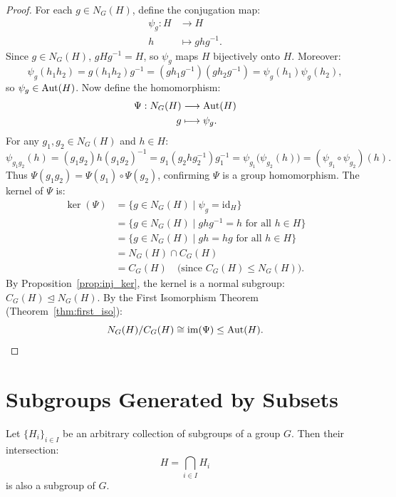 \begin{proof}
For each $g \in N_G(H)$, define the conjugation map:
\begin{align*}
\psi_g: H &\longrightarrow H \\
h &\longmapsto ghg^{-1}.
\end{align*}
Since $g \in N_G(H)$, $gHg^{-1} = H$, so $\psi_g$ maps $H$ bijectively onto $H$. Moreover:
\begin{equation*}
\psi_g(h_1 h_2) = g(h_1 h_2)g^{-1} = (gh_1 g^{-1})(gh_2 g^{-1}) = \psi_g(h_1)\psi_g(h_2),
\end{equation*}
so $\psi_g \in \operatorname{Aut}(H)$.
Now define the homomorphism:
\begin{align*}
\Psi: N_G(H) &\longrightarrow \operatorname{Aut}(H) \\
g &\longmapsto \psi_g.
\end{align*}
For any $g_1, g_2 \in N_G(H)$ and $h \in H$:
\begin{equation*}
\psi_{g_1 g_2}(h) = (g_1 g_2)h(g_1 g_2)^{-1} = g_1(g_2 h g_2^{-1})g_1^{-1} = \psi_{g_1}\bigl(\psi_{g_2}(h)\bigr) = (\psi_{g_1} \circ \psi_{g_2})(h).
\end{equation*}
Thus $\Psi(g_1 g_2) = \Psi(g_1) \circ \Psi(g_2)$, confirming $\Psi$ is a group homomorphism.
The kernel of $\Psi$ is:
\begin{align*}
\ker(\Psi) &= \{ g \in N_G(H) \mid \psi_g = \text{id}_H \} \\
&= \{ g \in N_G(H) \mid ghg^{-1} = h \text{ for all } h \in H \} \\
&= \{ g \in N_G(H) \mid gh = hg \text{ for all } h \in H \} \\
&= N_G(H) \cap C_G(H) \\
&= C_G(H) \quad \text{(since $C_G(H) \le N_G(H)$)}.
\end{align*}
By Proposition~\ref{prop:inj_ker}, the kernel is a normal subgroup: $C_G(H) \trianglelefteq N_G(H)$.
By the First Isomorphism Theorem (Theorem~\ref{thm:first_iso}):
\begin{equation*}
N_G(H)/C_G(H) \cong \operatorname{im}(\Psi) \le \operatorname{Aut}(H).
\end{equation*}
\end{proof}

\section{Subgroups Generated by Subsets}
\label{sec:generated_subgroups}

\begin{proposition}
\label{prop:subgroup_intersection}
Let $\{ H_i \}_{i \in I}$ be an arbitrary collection of subgroups of a group $G$. Then their intersection:
\begin{equation}
H = \bigcap_{i \in I} H_i
\end{equation}
is also a subgroup of $G$.
\end{proposition}

